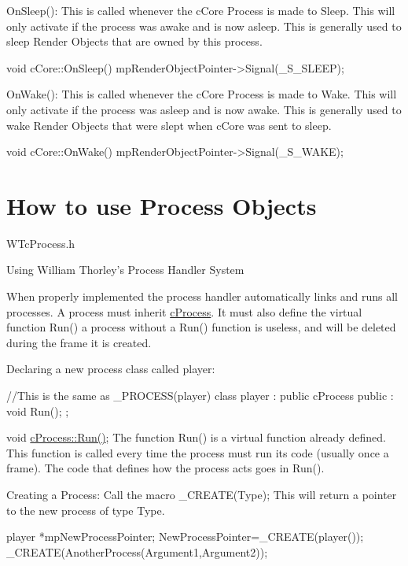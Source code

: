 OnSleep(): This is called whenever the cCore Process is made to Sleep. This will only activate if the process was awake and is now asleep. This is generally used to sleep Render Objects that are owned by this process.


\begin{DoxyCode}
 void cCore::OnSleep()
 {
 mpRenderObjectPointer->Signal(_S_SLEEP);
 }
\end{DoxyCode}


OnWake(): This is called whenever the cCore Process is made to Wake. This will only activate if the process was asleep and is now awake. This is generally used to wake Render Objects that were slept when cCore was sent to sleep.


\begin{DoxyCode}
 void cCore::OnWake()
 {
 mpRenderObjectPointer->Signal(_S_WAKE);
 }
\end{DoxyCode}
\hypertarget{_using_engine_page_ProcessObjectsPage}{}\section{How to use Process Objects}\label{_using_engine_page_ProcessObjectsPage}
WTcProcess.h

Using William Thorley’s Process Handler System

When properly implemented the process handler automatically links and runs all processes. A process must inherit \hyperlink{classc_process}{cProcess}. It must also define the virtual function Run() a process without a Run() function is useless, and will be deleted during the frame it is created.

Declaring a new process class called player: 
\begin{DoxyCode}
 //This is the same as _PROCESS(player)
 class player : public cProcess
 {
 public :
 void Run();
 };
\end{DoxyCode}


void \hyperlink{classc_process_a3e0fab4ccc0a8fb065d50eb88b6a0dd5}{cProcess::Run()}; The function Run() is a virtual function already defined. This function is called every time the process must run its code (usually once a frame). The code that defines how the process acts goes in Run().

Creating a Process: Call the macro \_\-CREATE(Type); This will return a pointer to the new process of type Type. 
\begin{DoxyCode}
 player *mpNewProcessPointer;
 NewProcessPointer=_CREATE(player());
 _CREATE(AnotherProcess(Argument1,Argument2));
\end{DoxyCode}


